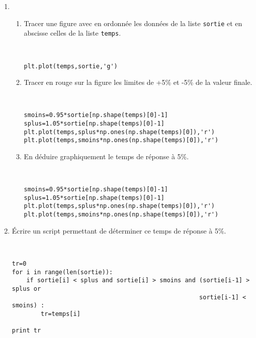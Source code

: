 \documentclass[a4paper,12pt]{article}
\begin{document}
\begin{enumerate}
\item \begin{enumerate}
\item Tracer une figure avec en ordonnée les données de la liste \verb?sortie? et en abscisse celles de la liste \verb?temps?.
 \begin{solution}~\ \\
\begin{verbatim}
plt.plot(temps,sortie,'g')
\end{verbatim}
\end{solution}
\item Tracer en rouge sur la figure les limites de +5\% et -5\% de la valeur finale.
 \begin{solution}~\ \\
\begin{verbatim}
smoins=0.95*sortie[np.shape(temps)[0]-1]
splus=1.05*sortie[np.shape(temps)[0]-1]
plt.plot(temps,splus*np.ones(np.shape(temps)[0]),'r')
plt.plot(temps,smoins*np.ones(np.shape(temps)[0]),'r')
\end{verbatim}
\end{solution}
\item En déduire graphiquement le temps de réponse à 5\%.
 \begin{solution}~\ \\
\begin{verbatim}
smoins=0.95*sortie[np.shape(temps)[0]-1]
splus=1.05*sortie[np.shape(temps)[0]-1]
plt.plot(temps,splus*np.ones(np.shape(temps)[0]),'r')
plt.plot(temps,smoins*np.ones(np.shape(temps)[0]),'r')
\end{verbatim}
\end{solution}
\end{enumerate}
 \item Écrire un script permettant de déterminer ce temps de réponse à 5\%.
  \begin{solution}~\ \\
\begin{verbatim}
tr=0
for i in range(len(sortie)):
    if sortie[i] < splus and sortie[i] > smoins and (sortie[i-1] > splus or
                                                    sortie[i-1] < smoins) :
        tr=temps[i]
        
print tr
\end{verbatim}
\end{solution}
\end{enumerate}
\end{document}
